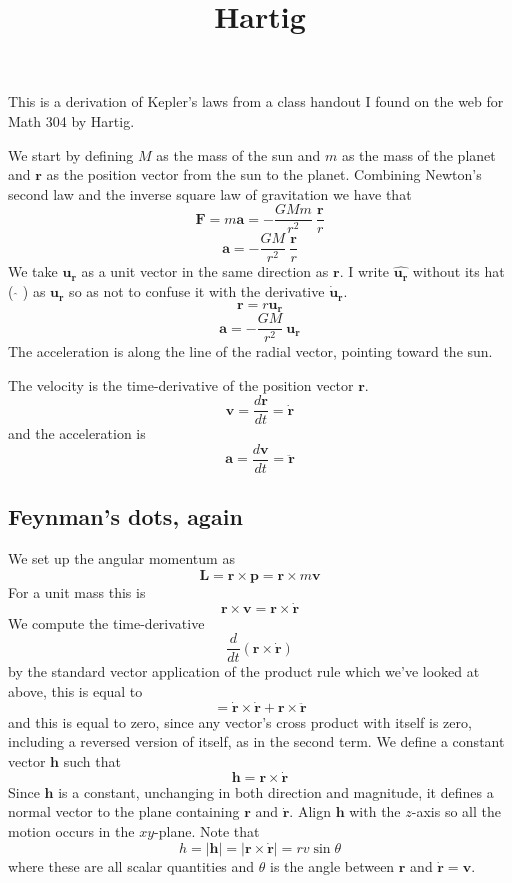 \documentclass[11pt, oneside]{article}
\title{Hartig}
\date{}
\begin{document}
\maketitle
\Large

This is a derivation of Kepler's laws from a class handout I found on the web for Math 304 by Hartig.

We start by defining $M$ as the mass of the sun and $m$ as the mass of the planet and $\mathbf{r}$ as the position vector from the sun to the planet.  Combining Newton's second law and the inverse square law of gravitation we have that
\[ \mathbf{F} = m \mathbf{a} = -\frac{GMm}{r^2} \ \frac{\mathbf{r}}{r}  \]
\[ \mathbf{a} = -\frac{GM}{r^2} \ \frac{\mathbf{r}}{r}  \]
We take $\mathbf{u_r}$ as a unit vector in the same direction as $\mathbf{r}$.  I write $\hat{\mathbf{u_r}}$ without its hat ( $\hat{}$ ) as $\mathbf{u_r}$ so as not to confuse it with the derivative $\dot{\mathbf{u}}_\mathbf{r}$.
\[ \mathbf{r} = r \mathbf{u_r} \]
\[ \mathbf{a} = -\frac{GM}{r^2} \ \mathbf{u_r}  \]
The acceleration is along the line of the radial vector, pointing toward the sun.

The velocity is the time-derivative of the position vector $\mathbf{r}$.
\[ \mathbf{v} = \frac{d\mathbf{r}}{dt} = \dot{\mathbf{r}} \]
and the acceleration is
\[ \mathbf{a} = \frac{d\mathbf{v}}{dt} = \ddot{\mathbf{r}} \]

\subsection*{Feynman's dots, again}
We set up the angular momentum as 
\[ \mathbf{L} = \mathbf{r} \times \mathbf{p}  =  \mathbf{r} \times m\mathbf{v}\]
For a unit mass this is
\[ \mathbf{r} \times \mathbf{v} =  \mathbf{r} \times \dot{\mathbf{r}} \]
We compute the time-derivative
\[ \frac{d}{dt} (\mathbf{r} \times \dot{\mathbf{r}}) \]
by the standard vector application of the product rule which we've looked at above, this is equal to 
\[ =  \dot{\mathbf{r}} \times \dot{\mathbf{r}} + \mathbf{r} \times \ddot{\mathbf{r}} \]
and this is equal to zero, since any vector's cross product with itself is zero, including a reversed version of itself, as in the second term.  We define a constant vector $\mathbf{h}$ such that
\[ \mathbf{h} = \mathbf{r} \times \dot{\mathbf{r}} \]
Since $\mathbf{h}$ is a constant, unchanging in both direction and magnitude, it defines a normal vector to the plane containing $\mathbf{r}$ and $\dot{\mathbf{r}}$.  Align $\mathbf{h}$ with the $z$-axis so all the motion occurs in the $xy$-plane.
Note that 
\[ h = |\mathbf{h}| = | \mathbf{r} \times \dot{\mathbf{r}} | = rv \sin \theta \]
where these are all scalar quantities and $\theta$ is the angle between $\mathbf{r}$ and $\dot{\mathbf{r}} = \mathbf{v}$.
\end{document}
